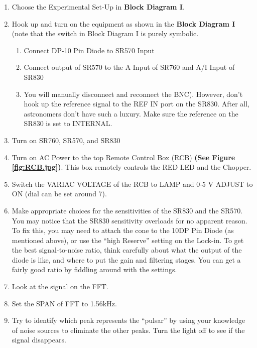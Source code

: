 \documentclass{../lab}
\begin{document}
\begin{enumerate}
    \item Choose the Experimental Set-Up in \textbf{Block Diagram I}.

    \item Hook up and turn on the equipment as shown in the \textbf{Block Diagram I} (note that the switch in Block Diagram I is purely symbolic.
    \begin{enumerate}
        \item Connect DP-10 Pin Diode to SR570 Input

        \item Connect output of SR570 to the A Input of SR760 and A/I Input of SR830

        \item You will manually disconnect and reconnect the BNC). However, don't hook up the reference signal to the REF IN port on the SR830. After all, astronomers don't have such a luxury. Make sure the reference on the SR830 is set to INTERNAL.
    \end{enumerate}

    \item Turn on SR760, SR570, and SR830

    \item Turn on AC Power to the top Remote Control Box (RCB) \textbf{(See Figure \ref{fig:RCB.jpg})}. This box remotely controls the RED LED and the Chopper.

    \item Switch the VARIAC VOLTAGE of the RCB to LAMP and 0-5 V ADJUST to ON (dial can be set around 7).

    \item Make appropriate choices for the sensitivities of the SR830 and the SR570. You may notice that the SR830 sensitivity overloads for no apparent reason. To fix this, you may need to attach the cone to the 10DP Pin Diode (as mentioned above), or use the ``high Reserve'' setting on the Lock-in. To get the best signal-to-noise ratio, think carefully about what the output of the diode is like, and where to put the gain and filtering stages. You can get a fairly good ratio by fiddling around with the settings.

    \item Look at the signal on the FFT.

    \item Set the SPAN of FFT to 1.56kHz.

    \item Try to identify which peak represents the ``pulsar'' by using your knowledge of noise sources to eliminate the other peaks. Turn the light off to see if the signal disappears.


\end{enumerate}
\end{document}
